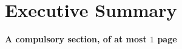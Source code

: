 \documentclass[ %
                    author={Alexander Hill},
                supervisor={Dr. Benjamin Sach},
                    degree={MEng},
                     title={MARMOSET},
                  subtitle={Multi-Agent Route Management using Online Simulation for Efficient Transportation},
                      type={research},
                      year={2016} ]{dissertation}
\begin{document}


\maketitle


\frontmatter


\makedecl


\tableofcontents
\listoffigures
\lstlistoflistings



\chapter*{Executive Summary}

{\bf A compulsory section, of at most $1$ page}
\vspace{1cm}

\end{document}
